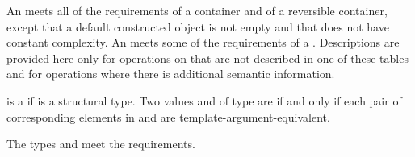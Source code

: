 \pnum
{}%
An  meets all of the requirements of a container and
of a reversible container, except that a default
constructed  object is not empty and that  does not have constant
complexity. An  meets some of the requirements of a
.
Descriptions are provided here
only for operations on  that are not described in
one of these tables and
for operations where there is additional semantic information.

\pnum
{} is a  if
 is a structural type.
Two values  and  of type 
are  if and only if
each pair of corresponding elements in  and 
are template-argument-equivalent.

\pnum
The types  and  meet
the  requirements.


